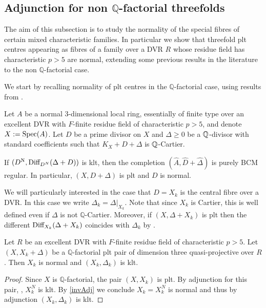 	\subsection{Adjunction for non $\mathbb{Q}$-factorial threefolds}
	The aim of this subsection is to study the normality of the special fibres of certain mixed characteristic families. In particular we show that threefold plt centres appearing as fibres of a family over a DVR $R$ whose residue field has characteristic $p>5$ are normal, extending some previous results in the literature to the non $\mathbb{Q}$-factorial case. 
	
	We start by recalling normality of plt centres in the $\mathbb{Q}$-factorial case, using results from \cite{ma2019analog}.
	\begin{theorem}{\cite[Theorem G]{ma2019analog}}\label{invAdj}
		Let $A$ be a normal 3-dimensional local ring, essentially of finite type over an excellent DVR with $F$-finite residue field of characteristic $p > 5$, and denote $X: = \operatorname{Spec} (A)$.
		Let $D$ be a prime divisor on $X$ and $\Delta \geq 0$ be a $\mathbb{Q}$-divisor with standard coefficients such that $K_X + D + \Delta$ is $\mathbb{Q}$-Cartier.  
		
		If $(D^{\mathrm{N}}, \textup{Diff}_{D^N}(\Delta+D))$ is klt, then the completion $(\widehat{A}, \widehat{D}+\widehat{\Delta})$ is purely BCM regular. In particular, $(X, D+\Delta)$ is plt and $D$ is normal.	
	\end{theorem}
	
	We will particularly interested in the case that $D=X_{k}$ is the central fibre over a DVR. 
	In this case we write $\Delta_{k}=\Delta|_{X_k}$. Note that since $X_{k}$ is Cartier, this is well defined even if $\Delta$ is not $\mathbb{Q}$-Cartier.
	Moreover, if $(X,\Delta+X_{k})$ is plt then the different $\textup{Diff}_{X_k}(\Delta+X_k)$ coincides with $\Delta_{k}$ by \cite[Proposition 4.5]{kk-singbook}.
	
	\begin{corollary}\label{normality}
		Let $R$ be an excellent DVR with $F$-finite residue field of characteristic $p>5$. Let $(X,X_{k}+\Delta)$ be a $\mathbb{Q}$-factorial plt pair of dimension three quasi-projective over $R$. 
		Then $X_{k}$ is normal and $(X_k, \Delta_k)$ is klt.
	\end{corollary}
	\begin{proof}
		Since $X$ is $\mathbb{Q}$-factorial, the pair $(X, X_k)$ is plt.
			By adjunction for this pair, \cite[Lemma 4.8]{kk-singbook}, $X^{N}_{k}$ is klt.  
		By \autoref{invAdj} we conclude $X_{k}=X^{N}_{k}$ is normal and thus by adjunction $(X_k, \Delta_k)$ is klt.
	\end{proof}
	
